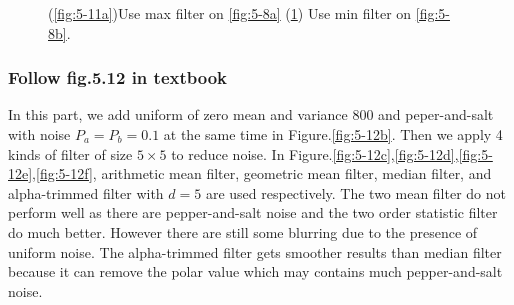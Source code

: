 \begin{figure}[h]
\begin{subfigure}[b]{0.4\linewidth}
		\caption{}
		\label{fig:5-11b}
	\end{subfigure}
  	\caption{(\ref{fig:5-11a})Use max filter on \ref{fig:5-8a} (\ref{fig:5-11b}) Use min filter on \ref{fig:5-8b}.}
  	\label{fig:5-11}
\end{figure}

\subsubsection{Follow fig.5.12 in textbook}
In this part, we add uniform of zero mean and variance 800 and peper-and-salt with noise $P_a=P_b=0.1$ at the same time in Figure.\ref{fig:5-12b}. Then we apply 4 kinds of filter of size $5\times5$ to reduce noise. In Figure.\ref{fig:5-12c},\ref{fig:5-12d},\ref{fig:5-12e},\ref{fig:5-12f}, arithmetic mean filter, geometric mean filter, median filter, and alpha-trimmed filter with $d=5$ are used respectively. The two mean filter do not perform well as there are pepper-and-salt noise and the two order statistic filter do much better. However there are still some blurring due to the presence of uniform noise. The alpha-trimmed filter gets smoother results than median filter because it can remove the polar value which may contains much pepper-and-salt noise.
